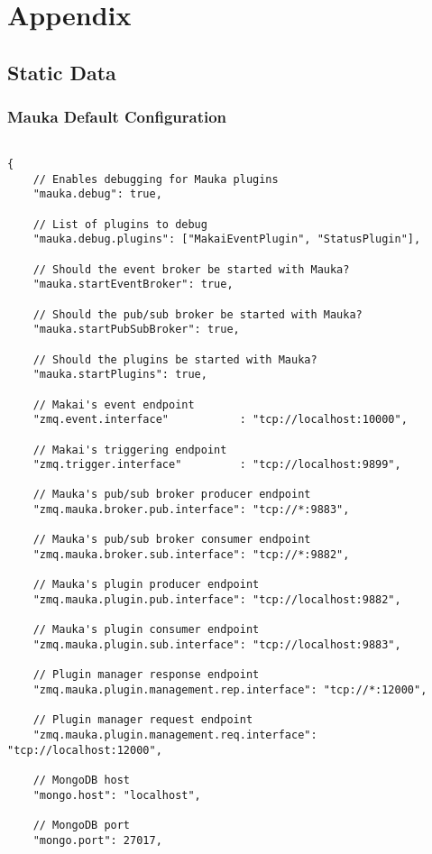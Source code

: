 \appendix
\chapter{Appendix}
\section{Static Data}

\subsection{Mauka Default Configuration}
\label{appendix:MaukaConfig}
\begin{verbatim}

{
	// Enables debugging for Mauka plugins
	"mauka.debug": true,

	// List of plugins to debug
	"mauka.debug.plugins": ["MakaiEventPlugin", "StatusPlugin"],

	// Should the event broker be started with Mauka?
	"mauka.startEventBroker": true,

	// Should the pub/sub broker be started with Mauka?
	"mauka.startPubSubBroker": true,

	// Should the plugins be started with Mauka?
	"mauka.startPlugins": true,

	// Makai's event endpoint
	"zmq.event.interface"           : "tcp://localhost:10000",

	// Makai's triggering endpoint
	"zmq.trigger.interface"         : "tcp://localhost:9899",

	// Mauka's pub/sub broker producer endpoint
	"zmq.mauka.broker.pub.interface": "tcp://*:9883",

	// Mauka's pub/sub broker consumer endpoint
	"zmq.mauka.broker.sub.interface": "tcp://*:9882",

	// Mauka's plugin producer endpoint
	"zmq.mauka.plugin.pub.interface": "tcp://localhost:9882",

	// Mauka's plugin consumer endpoint
	"zmq.mauka.plugin.sub.interface": "tcp://localhost:9883",

	// Plugin manager response endpoint
	"zmq.mauka.plugin.management.rep.interface": "tcp://*:12000",

	// Plugin manager request endpoint
	"zmq.mauka.plugin.management.req.interface": "tcp://localhost:12000",

	// MongoDB host
	"mongo.host": "localhost",

	// MongoDB port
	"mongo.port": 27017,


\end{verbatim}
